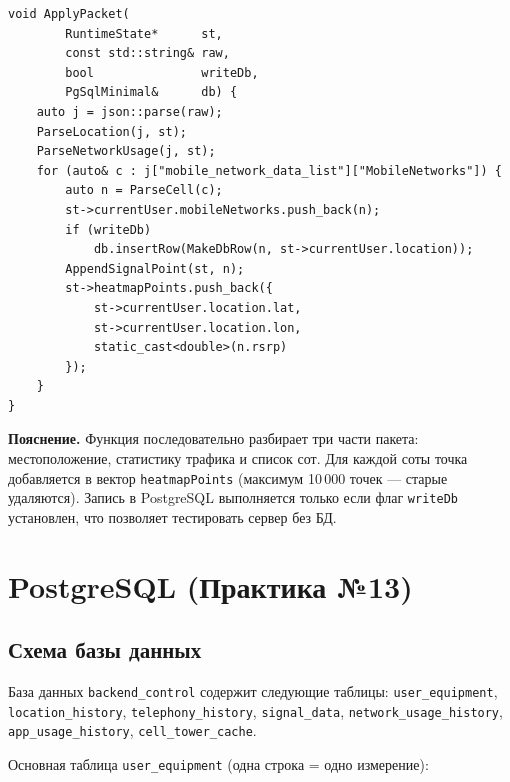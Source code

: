 \documentclass[a4paper,14pt,oneside,openany]{memoir}
\begin{document}
\begin{lstlisting}[language=CppSeventeen,
    caption={src/core/json\_parser.cpp --- ApplyPacket}]
void ApplyPacket(
        RuntimeState*      st,
        const std::string& raw,
        bool               writeDb,
        PgSqlMinimal&      db) {
    auto j = json::parse(raw);
    ParseLocation(j, st);
    ParseNetworkUsage(j, st);
    for (auto& c : j["mobile_network_data_list"]["MobileNetworks"]) {
        auto n = ParseCell(c);
        st->currentUser.mobileNetworks.push_back(n);
        if (writeDb)
            db.insertRow(MakeDbRow(n, st->currentUser.location));
        AppendSignalPoint(st, n);
        st->heatmapPoints.push_back({
            st->currentUser.location.lat,
            st->currentUser.location.lon,
            static_cast<double>(n.rsrp)
        });
    }
}
\end{lstlisting}

\textbf{Пояснение.} Функция последовательно разбирает три части пакета:
местоположение, статистику трафика и список сот. Для каждой соты точка
добавляется в вектор \texttt{heatmapPoints} (максимум 10\,000 точек ---
старые удаляются). Запись в PostgreSQL выполняется только если флаг
\texttt{writeDb} установлен, что позволяет тестировать сервер без БД.

\section{PostgreSQL (Практика №13)}

\subsection{Схема базы данных}

База данных \texttt{backend\_control} содержит следующие таблицы:
\texttt{user\_equipment}, \texttt{location\_history},
\texttt{telephony\_history}, \texttt{signal\_data},
\texttt{network\_usage\_history}, \texttt{app\_usage\_history},
\texttt{cell\_tower\_cache}.

Основная таблица \texttt{user\_equipment} (одна строка = одно измерение):
\end{document}
